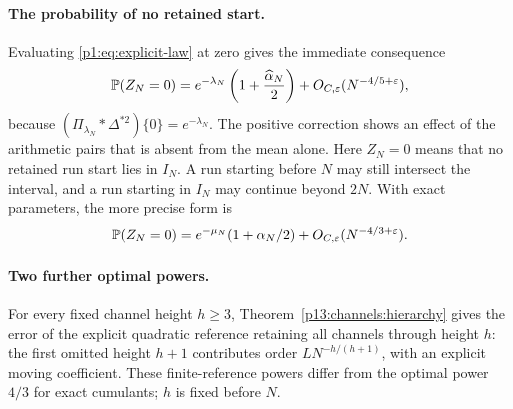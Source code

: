 \paragraph{The probability of no retained start.}
Evaluating \eqref{p1:eq:explicit-law} at zero gives the immediate
consequence
\begin{equation}
 \P(Z_N=0)=e^{-\lambda_N}
       \left(1+\frac{\widehat\alpha_N}{2}\right)
       +O_{C,\varepsilon}(N^{-4/5+\varepsilon}),
 \label{p1:eq:no-start}
\end{equation}
because \((\Pi_{\lambda_N}*\Delta^{*2})\{0\}=e^{-\lambda_N}\).
The positive correction shows an effect of the arithmetic pairs
that is absent from the mean alone. Here \(Z_N=0\) means that
no retained run start lies in \(I_N\). A run starting before
\(N\) may still intersect the interval, and a run starting in
\(I_N\) may continue beyond \(2N\).
With exact parameters, the more precise form is
\[
 \P(Z_N=0)=e^{-\mu_N}(1+\alpha_N/2)
                  +O_{C,\varepsilon}(N^{-4/3+\varepsilon}).
\]

\paragraph{Two further optimal powers.}
For every fixed channel height $h\ge3$,
Theorem~\ref{p13:channels:hierarchy} gives the error of the
explicit quadratic reference retaining all channels through height $h$:
the first omitted height $h+1$ contributes order
$LN^{-h/(h+1)}$, with an explicit moving coefficient.
These finite-reference powers differ from the optimal power $4/3$
for exact cumulants; $h$ is fixed before $N$.

